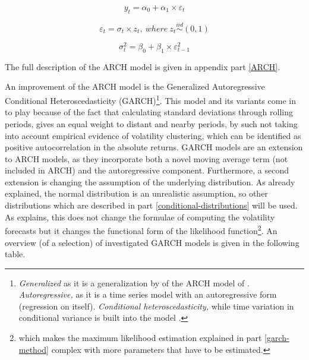 \documentclass[a4paper, nobind]{templates/ociamthesis}
\begin{document}
\begin{equation} 
y_{t} = \alpha_0 + \alpha_1 \times \varepsilon_t
 \label{eq:eq1} 
\end{equation}
\vspace{-15mm}

\begin{equation}
\varepsilon_{t} = \sigma_t \times z_t, \ where \ z_t \stackrel{iid}{\sim} (0,1)
 \label{eq:eq2} 
\end{equation}
\vspace{-15mm}

\begin{equation}
\sigma_{t}^{2} = \beta_0 + \beta_1 \times  \varepsilon_{t-1}^2 
 \label{eq:eq3}
\end{equation}

The full description of the ARCH model is given in appendix part \ref{ARCH}.

\noindent An improvement of the ARCH model is the Generalized Autoregressive Conditional Heteroscedasticity (GARCH)\footnote{\emph{Generalized} as it is a generalization by \textcite{bollerslev1986} of the ARCH model of \textcite{engle1982}. \emph{Autoregressive,} as it is a time series model with an autoregressive form (regression on itself). \emph{Conditional heteroscedasticity,} while time variation in conditional variance is built into the model \autocite{alexander2008}.}. This model and its variants come in to play because of the fact that calculating standard deviations through rolling periods, gives an equal weight to distant and nearby periods, by such not taking into account empirical evidence of volatility clustering, which can be identified as positive autocorrelation in the absolute returns. GARCH models are an extension to ARCH models, as they incorporate both a novel moving average term (not included in ARCH) and the autoregressive component. Furthermore, a second extension is changing the assumption of the underlying distribution. As already explained, the normal distribution is an unrealistic assumption, so other distributions which are described in part \ref{conditional-distributions} will be used. As \textcite{alexander2008} explains, this does not change the formulae of computing the volatility forecasts but it changes the functional form of the likelihood function\footnote{which makes the maximum likelihood estimation explained in part \ref{garch-method} complex with more parameters that have to be estimated.}. An overview (of a selection) of investigated GARCH models is given in the following table.
\end{document}
